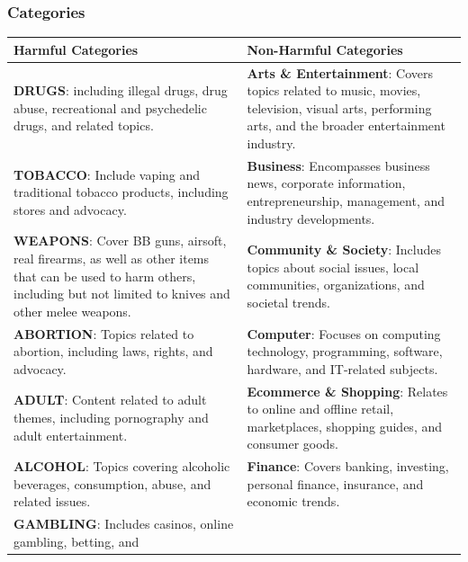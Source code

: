 \documentclass[
  titlepage]{article}
\begin{document}
\subsubsection{Categories}\label{categories}

\begin{longtable}[]{@{}
  >{\raggedright\arraybackslash}p{}
  >{\raggedright\arraybackslash}p{}@{}}
\toprule\noalign{}
\begin{minipage}[b]{\linewidth}\raggedright
Harmful Categories
\end{minipage} & \begin{minipage}[b]{\linewidth}\raggedright
Non-Harmful Categories
\end{minipage} \\
\midrule\noalign{}
\endhead
\bottomrule\noalign{}
\endlastfoot
\textbf{DRUGS}: including illegal drugs, drug abuse, recreational and
psychedelic drugs, and related topics. & \textbf{Arts \& Entertainment}:
Covers topics related to music, movies, television, visual arts,
performing arts, and the broader entertainment industry. \\
\textbf{TOBACCO}: Include vaping and traditional tobacco products,
including stores and advocacy. & \textbf{Business}: Encompasses business
news, corporate information, entrepreneurship, management, and industry
developments. \\
\textbf{WEAPONS}: Cover BB guns, airsoft, real firearms, as well as
other items that can be used to harm others, including but not limited
to knives and other melee weapons. & \textbf{Community \& Society}:
Includes topics about social issues, local communities, organizations,
and societal trends. \\
\textbf{ABORTION}: Topics related to abortion, including laws, rights,
and advocacy. & \textbf{Computer}: Focuses on computing technology,
programming, software, hardware, and IT-related subjects. \\
\textbf{ADULT}: Content related to adult themes, including pornography
and adult entertainment. & \textbf{Ecommerce \& Shopping}: Relates to
online and offline retail, marketplaces, shopping guides, and consumer
goods. \\
\textbf{ALCOHOL}: Topics covering alcoholic beverages, consumption,
abuse, and related issues. & \textbf{Finance}: Covers banking,
investing, personal finance, insurance, and economic trends. \\
\textbf{GAMBLING}: Includes casinos, online gambling, betting, and

\end{longtable}
\end{document}
